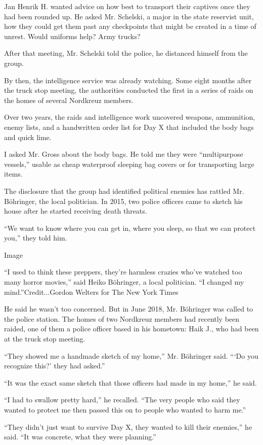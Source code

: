Jan Henrik H. wanted advice on how best to transport their captives once
they had been rounded up. He asked Mr. Schelski, a major in the state
reservist unit, how they could get them past any checkpoints that might
be created in a time of unrest. Would uniforms help? Army trucks?

After that meeting, Mr. Schelski told the police, he distanced himself
from the group.

By then, the intelligence service was already watching. Some eight
months after the truck stop meeting, the authorities conducted the first
in a series of raids on the homes of several Nordkreuz members.

Over two years, the raids and intelligence work uncovered weapons,
ammunition, enemy lists, and a handwritten order list for Day X that
included the body bags and quick lime.

I asked Mr. Gross about the body bags. He told me they were
``multipurpose vessels,'' usable as cheap waterproof sleeping bag covers
or for transporting large items.

The disclosure that the group had identified political enemies has
rattled Mr. Böhringer, the local politician. In 2015, two police
officers came to sketch his house after he started receiving death
threats.

``We want to know where you can get in, where you sleep, so that we can
protect you,'' they told him.

Image

``I used to think these preppers, they're harmless crazies who've
watched too many horror movies,'' said Heiko Böhringer, a local
politician. ``I changed my mind.''Credit...Gordon Welters for The New
York Times

He said he wasn't too concerned. But in June 2018, Mr. Böhringer was
called to the police station. The homes of two Nordkreuz members had
recently been raided, one of them a police officer based in his
hometown: Haik J., who had been at the truck stop meeting.

``They showed me a handmade sketch of my home,'' Mr. Böhringer said.
```Do you recognize this?' they had asked.''

``It was the exact same sketch that those officers had made in my
home,'' he said.

``I had to swallow pretty hard,'' he recalled. ``The very people who
said they wanted to protect me then passed this on to people who wanted
to harm me.''

``They didn't just want to survive Day X, they wanted to kill their
enemies,'' he said. ``It was concrete, what they were planning.''

